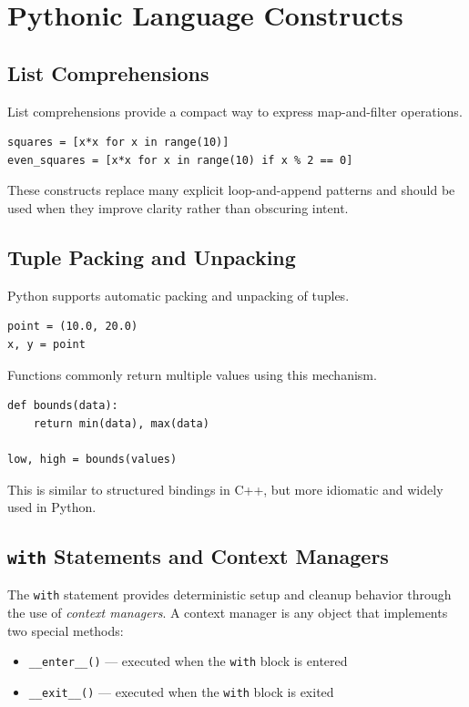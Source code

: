 \section{Pythonic Language Constructs}

\subsection{List Comprehensions}

List comprehensions provide a compact way to express map-and-filter operations.

\begin{verbatim}
squares = [x*x for x in range(10)]
even_squares = [x*x for x in range(10) if x % 2 == 0]
\end{verbatim}

These constructs replace many explicit loop-and-append patterns and should be used when they improve clarity rather than obscuring intent.

\subsection{Tuple Packing and Unpacking}

Python supports automatic packing and unpacking of tuples.

\begin{verbatim}
point = (10.0, 20.0)
x, y = point
\end{verbatim}

Functions commonly return multiple values using this mechanism.

\begin{verbatim}
def bounds(data):
    return min(data), max(data)

low, high = bounds(values)
\end{verbatim}

This is similar to structured bindings in C++, but more idiomatic and widely used in Python.

\subsection{\texttt{with} Statements and Context Managers}

The \texttt{with} statement provides deterministic setup and cleanup behavior through the use of \emph{context managers}. A context manager is any object that implements two special methods:

\begin{itemize}
  \item \texttt{\_\_enter\_\_()} --- executed when the \texttt{with} block is entered
  \item \texttt{\_\_exit\_\_()} --- executed when the \texttt{with} block is exited
\end{itemize}

